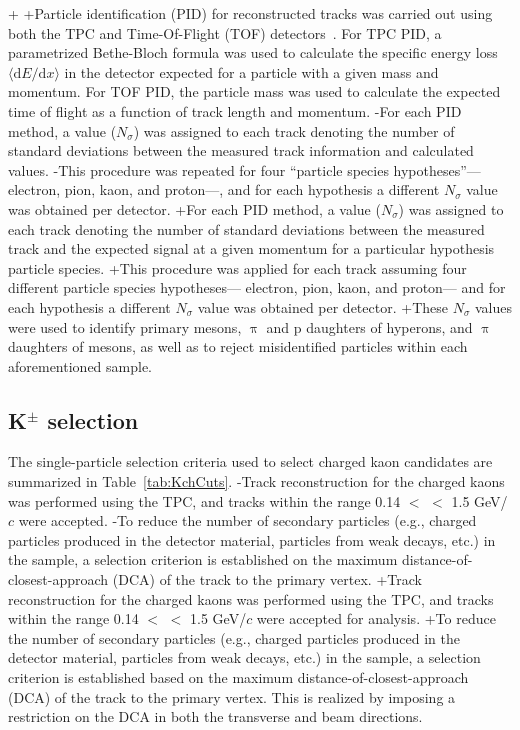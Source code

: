 {+
+Particle identification (PID) for reconstructed tracks was carried out using both the TPC and Time-Of-Flight (TOF) detectors~\cite{Abelev:2014ffa, Akindinov:2013tea}.  
 For TPC PID, a parametrized Bethe-Bloch formula was used to calculate the specific energy loss $\langle \mathrm{d}E/\mathrm{d}x \rangle$ in the detector expected for a particle with a given mass and momentum.  
 For TOF PID, the particle mass was used to calculate the expected time of flight as a function of track length and momentum.  
-For each PID method, a value ($N_{\sigma}$) was assigned to each track denoting the number of standard deviations between the measured track information and calculated values.  
-This procedure was repeated for four ``particle species hypotheses''--- electron, pion, kaon, and proton---, and for each hypothesis a different $N_{\sigma}$ value was obtained per detector.
+For each PID method, a value ($N_{\sigma}$) was assigned to each track denoting the number of standard deviations between the measured track and the expected signal at a given momentum for a particular hypothesis particle species.  
+This procedure was applied for each track assuming four different particle species hypotheses--- electron, pion, kaon, and proton--- and for each hypothesis a different $N_{\sigma}$ value was obtained per detector.
+These $N_{\sigma}$ values were used to identify primary \Kpm mesons, $\uppi$ and p daughters of \Lam hyperons, and $\uppi$ daughters of \Ks mesons, as well as to reject misidentified particles within each aforementioned sample.  
 
 \subsection{K$^{\pm}$ selection}
 \label{sec:KchSelection}
 The single-particle selection criteria used to select charged kaon candidates are summarized in Table~\ref{tab:KchCuts}.
-Track reconstruction for the charged kaons was performed using the TPC, and tracks within the range 0.14 $<$ \pt $<$ 1.5 GeV/$c$ were accepted.
-To reduce the number of secondary particles (e.g., charged particles produced in the detector material, particles from weak decays, etc.) in the sample, a selection criterion is established on the maximum distance-of-closest-approach (DCA) of the track to the primary vertex.
+Track reconstruction for the charged kaons was performed using the TPC, and tracks within the range 0.14 $<$ \pt $<$ 1.5 GeV/$c$ were accepted for analysis.
+To reduce the number of secondary particles (e.g., charged particles produced in the detector material, particles from weak decays, etc.) in the sample, a selection criterion is established based on the maximum distance-of-closest-approach (DCA) of the track to the primary vertex.
 This is realized by imposing a restriction on the DCA in both the transverse and beam directions.
 
}
